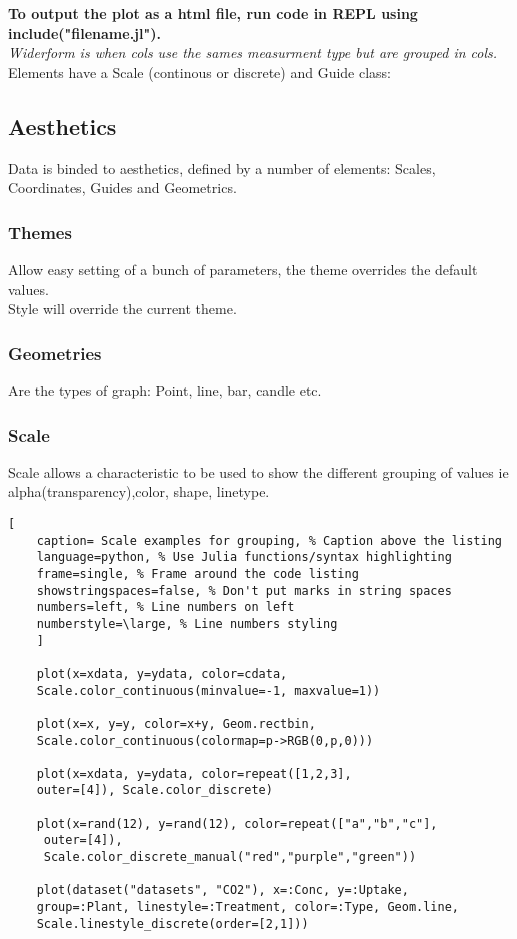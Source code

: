 \documentclass[11pt]{scrartcl} %
\begin{document}
\textbf{To output the plot as a html file, run code in REPL using include("filename.jl").}\\

\textit{Widerform is when cols use the sames measurment type but are grouped in cols.}\\

Elements have a Scale (continous or discrete) and Guide class:\\

\subsection{Aesthetics}

Data is binded to aesthetics, defined by a number of elements: Scales, Coordinates, Guides and
Geometrics.

\subsubsection{Themes}

Allow easy setting of a bunch of parameters, the theme overrides the default values.\\

Style will override the current theme.

\subsubsection{Geometries}

Are the types of graph: Point, line, bar, candle etc.

\subsubsection{Scale}

Scale allows a characteristic to be used to show the different grouping of values ie
alpha(transparency),color, shape, linetype.\\

\begin{lstlisting}[
	caption= Scale examples for grouping, % Caption above the listing
	language=python, % Use Julia functions/syntax highlighting
	frame=single, % Frame around the code listing
	showstringspaces=false, % Don't put marks in string spaces
	numbers=left, % Line numbers on left
	numberstyle=\large, % Line numbers styling
	]

	plot(x=xdata, y=ydata, color=cdata,
	Scale.color_continuous(minvalue=-1, maxvalue=1))

	plot(x=x, y=y, color=x+y, Geom.rectbin,
    Scale.color_continuous(colormap=p->RGB(0,p,0)))

	plot(x=xdata, y=ydata, color=repeat([1,2,3], 
	outer=[4]), Scale.color_discrete)
	
	plot(x=rand(12), y=rand(12), color=repeat(["a","b","c"],
	 outer=[4]),
     Scale.color_discrete_manual("red","purple","green"))

	plot(dataset("datasets", "CO2"), x=:Conc, y=:Uptake,
    group=:Plant, linestyle=:Treatment, color=:Type, Geom.line,
    Scale.linestyle_discrete(order=[2,1]))

\end{lstlisting}
\end{document}
